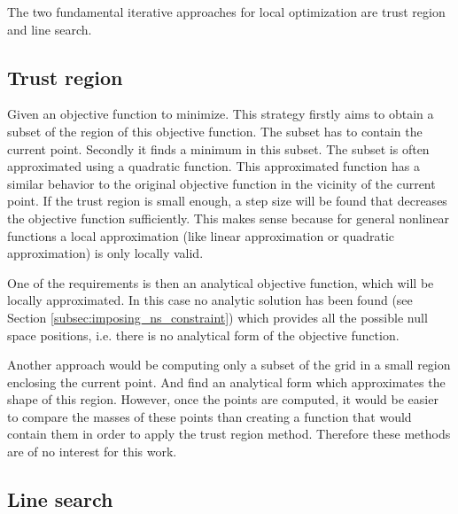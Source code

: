 The two fundamental iterative approaches for local optimization	 are trust region and line search.

\subsection{Trust region}
\label{subsec:tregion}

Given an objective function to minimize. This  strategy firstly aims to obtain a subset of the region of this objective function. The subset has to contain the current point. Secondly it finds a minimum in this subset. The subset is often approximated using a quadratic function. This approximated function has a similar behavior to the original objective function in the vicinity of the current point. If the trust region is small enough, a step size will be found that decreases the objective function sufficiently. This makes sense because for general nonlinear functions a local approximation (like linear approximation or quadratic approximation)  is only locally valid.



One of the requirements is then an analytical objective function, which will be locally approximated. In this case no analytic solution has been found (see Section \ref{subsec:imposing_ns_constraint}) which  provides all the possible null space positions, i.e. there is no analytical form of the objective function.


Another approach would be computing only a subset of the grid in a small region enclosing the current point. And find an analytical form which approximates the shape of this region. However, once the points are computed, it would be easier to compare the masses of these points than creating a function that would contain them in order to apply the trust region method. Therefore these methods are of no interest for this work.





\subsection{Line search}
\label{subsec:lsearch}


